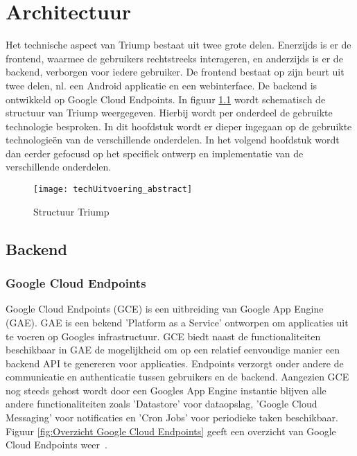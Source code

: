 
\chapter{Architectuur}

Het technische aspect van Triump bestaat uit twee grote delen. Enerzijds is er de frontend, waarmee de gebruikers rechtstreeks interageren, en anderzijds is er de backend, verborgen voor iedere gebruiker. De frontend bestaat op zijn beurt uit twee delen, nl. een Android applicatie en een webinterface. De backend is ontwikkeld op Google Cloud Endpoints. In figuur \ref{fig:algemene structuur} wordt schematisch de structuur van Triump weergegeven. Hierbij wordt per onderdeel de gebruikte technologie besproken. In dit hoofdstuk wordt er dieper ingegaan op de gebruikte technologieën van de verschillende onderdelen. In het volgend hoofdstuk wordt dan eerder gefocusd op het specifiek ontwerp en implementatie van de verschillende onderdelen.

\begin{figure}[H]
	\centering
	\texttt{[image: techUitvoering\_abstract]}
	\caption{Structuur Triump}
	\label{fig:algemene structuur}
	
\end{figure}

\section{Backend}

\subsection{Google Cloud Endpoints}
\label{sec: GCE}
Google Cloud Endpoints (GCE) is een uitbreiding van Google App Engine (GAE). GAE is een bekend 'Platform as a Service' ontworpen om applicaties uit te voeren op Googles infrastructuur. GCE biedt naast de functionaliteiten beschikbaar in GAE de mogelijkheid om op een relatief eenvoudige manier een backend API te genereren voor applicaties.  Endpoints verzorgt onder andere de communicatie en authenticatie tussen gebruikers en de backend.
Aangezien GCE nog steeds gehost wordt door een Googles App Engine instantie blijven alle andere functionaliteiten zoals 'Datastore' voor dataopslag, 'Google Cloud Messaging' voor notificaties en 'Cron Jobs' voor periodieke taken beschikbaar. Figuur \ref{fig:Overzicht Google Cloud Endpoints} geeft een overzicht van Google Cloud Endpoints weer~\cite{Google_endpoints}.

